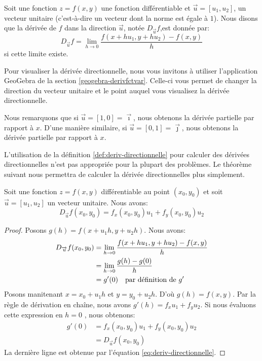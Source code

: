 \documentclass[]{book}
\theoremstyle{definition}
\theoremstyle{definition}
\theoremstyle{definition}
\theoremstyle{remark}
\let\BeginKnitrBlock\begin \let\EndKnitrBlock\end
\begin{document}
\BeginKnitrBlock{definition}[La dérivée directionnelle]
\protect\hypertarget{def:deriv-directionnelle}{}{\label{def:deriv-directionnelle}
{} }Soit une fonction
\(z=f(x,y)\) une fonction différentiable et
\(\overrightarrow{u}=[u_1,u_2]\), un vecteur unitaire (c'est-à-dire un
vecteur dont la norme est égale à \(1\)). Nous disons que la dérivée de
\(f\) dans la direction \(\overrightarrow{u}\), notée
\(D_{\overrightarrow{u}}f\),est donnée par:
\[ D_{\overrightarrow{u}}f = \lim_{h\to 0} \dfrac{f(x+hu_1,y+hu_2)-f(x,y)}{h} \]
si cette limite existe.
\EndKnitrBlock{definition}

Pour visualiser la dérivée directionnelle, nous vous invitons à utiliser
l'application GeoGebra de la section \ref{geogebra-derivfctvar}.
Celle-ci vous permet de changer la direction du vecteur unitaire et le
point auquel vous visualisez la dérivée directionnelle.

\BeginKnitrBlock{remark}
{}Nous remarquons que si
\(\overrightarrow{u}=[1,0]=\overrightarrow{\imath}\), nous obtenons la
dérivée partielle par rapport à \(x\). D'une manière similaire, si
\(\overrightarrow{u}=[0,1]=\overrightarrow{\jmath}\), nous obtenons la
dérivée partielle par rapport à \(x\).
\EndKnitrBlock{remark}

L'utilisation de la définition \ref{def:deriv-directionnelle} pour
calculer des dérivées directionnelles n'est pas appropriée pour la
plupart des problèmes. Le théorème suivant nous permettra de calculer la
dérivée directionnelles plus simplement.

\BeginKnitrBlock{theorem}
\protect\hypertarget{thm:derivee-directionnelle}{}{\label{thm:derivee-directionnelle}
}Soit une fonction \(z=f(x,y)\) différentiable au point \((x_0,y_0)\) et
soit \(\overrightarrow{u}=[u_1,u_2]\) un vecteur unitaire. Nous avons:
\[ D_{\overrightarrow{u}}f(x_0,y_0) = f_x(x_0,y_0)u_1 + f_y(x_0,y_0)u_2 \]
\EndKnitrBlock{theorem}

\BeginKnitrBlock{proof}
{}Posons \(g(h)=f(x+u_1h,y+u_2h)\). Nous avons:
\begin{align}
D_{\overrightarrow{u}}f(x_0,y_0) &= \lim_{h\to 0} \dfrac{f(x+hu_1,y+hu_2)-f(x,y)}{h} \notag\\
&= \lim_{h\to 0} \dfrac{g(h)-g(0)}{h} \notag\\
&= g'(0) \label{eq:deriv-directionnelle} \quad \text{par définition de $g'$}
\end{align} Posons manitenant \(x=x_0+u_1h\) et \(y=y_0+u_2h\). D'où
\(g(h)=f(x,y)\). Par la règle de dérivation en chaîne, nous avons
\(g'(h)=f_xu_1+f_yu_2\). Si nous évaluons cette expression en \(h=0\) ,
nous obtenons: \begin{align*}
g'(0) &= f_x(x_0,y_0)u_1+f_y(x_0,y_0)u_2 \\
&= D_{\overrightarrow{u}}f(x_0,y_0)
\end{align*} La dernière ligne est obtenue par l'équation
\eqref{eq:deriv-directionnelle}.
\EndKnitrBlock{proof}
\end{document}
